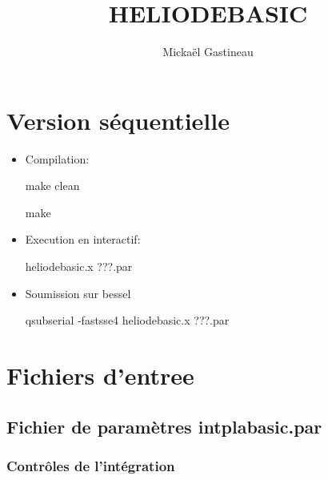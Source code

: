 \documentclass[11pt]{article}
\title{HELIODEBASIC}
\author{Micka\"el Gastineau}
\begin{document}
\maketitle

\section{Version s\'equentielle}

\begin{itemize}
 \item Compilation:  
 
make clean

make
 
\item Execution en interactif: 

heliodebasic.x  ???.par
\item Soumission sur bessel

qsubserial -fastsse4 heliodebasic.x  ???.par
\end{itemize}


\section{Fichiers d'entree}

\subsection{Fichier de param\`etres  intplabasic.par}

\subsubsection*{Contr\^oles de l'int\'egration}
\end{document}
